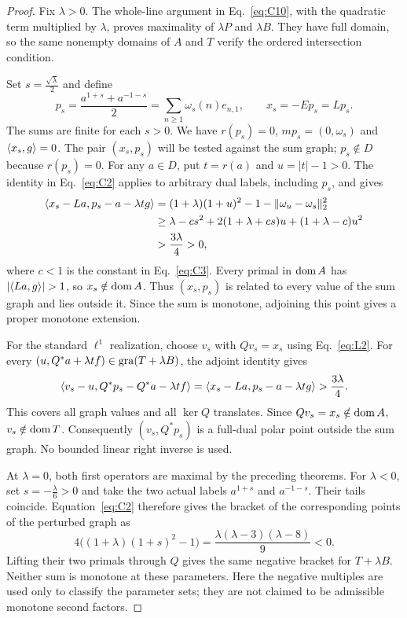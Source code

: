 \begin{proof}
Fix $\lambda>0$. The whole-line argument in Eq.~\eqref{eq:C10}, with
the quadratic term multiplied by $\lambda$, proves maximality of
$\lambda P$ and $\lambda B$. They have full domain, so the same nonempty
domains of $A$ and $T$ verify the ordered intersection condition.

Set $s=\frac{\sqrt{\lambda}}{2}$ and define
\begin{equation}
p_s=\frac{a^{1+s}+a^{-1-s}}2
   =\sum_{n\ge1}\omega_s(n)e_{n,1},\qquad x_s=-Ep_s=Lp_s.
\label{eq:parameter-query}
\end{equation}
The sums are finite for each $s>0$. We have $r(p_s)=0$,
$mp_s=(0,\omega_s)$ and $\langle x_s,g\rangle=0$. The pair $(x_s,p_s)$ will be tested against the sum graph; $p_s\notin D$
because $r(p_s)=0$.
For any $a\in D$, put $t=r(a)$ and $u=|t|-1>0$.
The identity in Eq.~\eqref{eq:C2} applies to arbitrary dual labels,
including $p_s$, and gives
\begin{equation}
\begin{aligned}
\langle x_s-La,p_s-a-\lambda t g\rangle
 &=(1+\lambda)(1+u)^2-1-\|\omega_u-\omega_s\|_2^2\\
 &\ge\lambda-cs^2+2(1+\lambda+cs)u+(1+\lambda-c)u^2\\
 &>\frac{3\lambda}{4}>0,
\end{aligned}
\label{eq:parameter-bracket}
\end{equation}
where $c<1$ is the constant in Eq.~\eqref{eq:C3}.
Every primal in $\operatorname{dom} A$ has $|\pair{La}{g}|>1$, so $x_s\notin\operatorname{dom} A$.
Thus $(x_s,p_s)$ is related to every value of the sum graph and lies
outside it. Since the sum is monotone, adjoining this point gives a
proper monotone extension.

For the standard $\ell^1$ realization, choose $v_s$ with $Qv_s=x_s$
using Eq.~\eqref{eq:L2}. For every $(u,Q^*a+\lambda t f)\in\operatorname{gra}(T+\lambda B)$,
the adjoint identity gives
\begin{equation}
\langle v_s-u,Q^*p_s-Q^*a-\lambda t f\rangle
=\langle x_s-La,p_s-a-\lambda t g\rangle>\frac{3\lambda}{4}.
\label{eq:parameter-l1}
\end{equation}
This covers all graph values and all $\ker Q$ translates.
Since $Qv_s=x_s\notin\operatorname{dom} A$, $v_s\notin\operatorname{dom} T$.
Consequently $(v_s,Q^*p_s)$ is a full-dual polar point outside the sum
graph. No bounded linear right inverse is used.

At $\lambda=0$, both first operators are maximal by the preceding
theorems. For $\lambda<0$, set $s=-\frac{\lambda}{6}>0$ and take the two actual
labels $a^{1+s}$ and $a^{-1-s}$. Their tails coincide. Equation~\eqref{eq:C2}
therefore gives the bracket of the corresponding points of the perturbed graph as
\begin{equation}
4\big((1+\lambda)(1+s)^2-1\big)
=\frac{\lambda(\lambda-3)(\lambda-8)}9<0.
\label{eq:parameter-negative}
\end{equation}
Lifting their two primals through $Q$ gives the same negative bracket
for $T+\lambda B$. Neither sum is monotone at these parameters.
Here the negative multiples are used only to classify the parameter
sets; they are not claimed to be admissible monotone second factors.


\end{proof}
